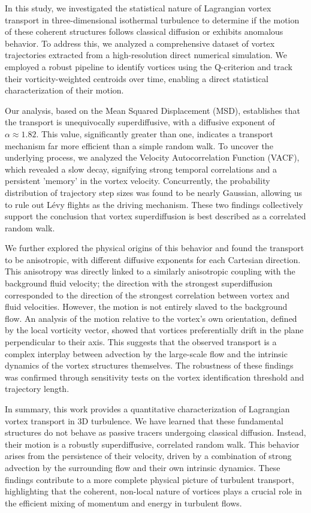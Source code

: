 \documentclass[]{article}
\begin{document}
In this study, we investigated the statistical nature of Lagrangian vortex transport in three-dimensional isothermal turbulence to determine if the motion of these coherent structures follows classical diffusion or exhibits anomalous behavior. To address this, we analyzed a comprehensive dataset of vortex trajectories extracted from a high-resolution direct numerical simulation. We employed a robust pipeline to identify vortices using the Q-criterion and track their vorticity-weighted centroids over time, enabling a direct statistical characterization of their motion.

Our analysis, based on the Mean Squared Displacement (MSD), establishes that the transport is unequivocally superdiffusive, with a diffusive exponent of $\alpha \approx 1.82$. This value, significantly greater than one, indicates a transport mechanism far more efficient than a simple random walk. To uncover the underlying process, we analyzed the Velocity Autocorrelation Function (VACF), which revealed a slow decay, signifying strong temporal correlations and a persistent 'memory' in the vortex velocity. Concurrently, the probability distribution of trajectory step sizes was found to be nearly Gaussian, allowing us to rule out Lévy flights as the driving mechanism. These two findings collectively support the conclusion that vortex superdiffusion is best described as a correlated random walk.

We further explored the physical origins of this behavior and found the transport to be anisotropic, with different diffusive exponents for each Cartesian direction. This anisotropy was directly linked to a similarly anisotropic coupling with the background fluid velocity; the direction with the strongest superdiffusion corresponded to the direction of the strongest correlation between vortex and fluid velocities. However, the motion is not entirely slaved to the background flow. An analysis of the motion relative to the vortex's own orientation, defined by the local vorticity vector, showed that vortices preferentially drift in the plane perpendicular to their axis. This suggests that the observed transport is a complex interplay between advection by the large-scale flow and the intrinsic dynamics of the vortex structures themselves. The robustness of these findings was confirmed through sensitivity tests on the vortex identification threshold and trajectory length.

In summary, this work provides a quantitative characterization of Lagrangian vortex transport in 3D turbulence. We have learned that these fundamental structures do not behave as passive tracers undergoing classical diffusion. Instead, their motion is a robustly superdiffusive, correlated random walk. This behavior arises from the persistence of their velocity, driven by a combination of strong advection by the surrounding flow and their own intrinsic dynamics. These findings contribute to a more complete physical picture of turbulent transport, highlighting that the coherent, non-local nature of vortices plays a crucial role in the efficient mixing of momentum and energy in turbulent flows.
\end{document}
